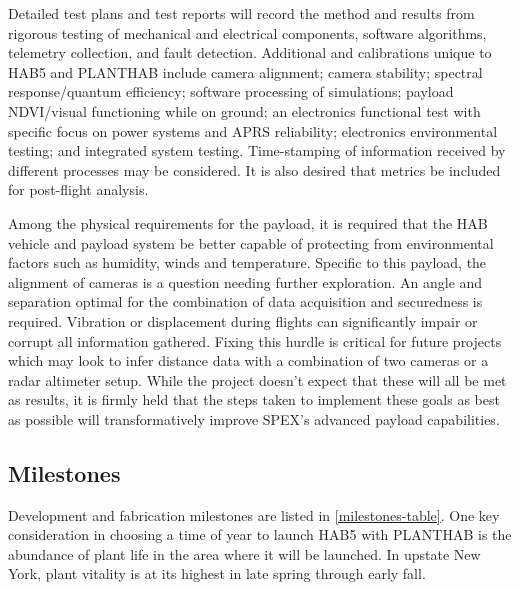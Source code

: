 \documentclass[conference]{IEEEtran} %
\begin{document}
Detailed test plans and test reports will record the method and results from rigorous testing of mechanical and electrical components, software algorithms, telemetry collection, and fault detection.
Additional and calibrations unique to HAB5 and PLANTHAB include camera alignment; camera stability; spectral response/quantum efficiency; software processing of simulations; payload NDVI/visual functioning while on ground; an electronics functional test with specific focus on power systems and APRS reliability; electronics environmental testing; and integrated system testing.
Time-stamping of information received by different processes may be considered. 
It is also desired that metrics be included for post-flight analysis.

Among the physical requirements for the payload, it is required that the HAB vehicle and payload system be better capable of protecting from environmental factors such as humidity, winds and temperature. Specific to this payload, the alignment of cameras is a question needing further exploration. An angle and separation optimal for the combination of data acquisition and securedness is required. Vibration or displacement during flights can significantly impair or corrupt all information gathered. Fixing this hurdle is critical for future projects which may look to infer distance data with a combination of two cameras or a radar altimeter setup. While the project doesn't expect that these will all be met as results, it is firmly held that the steps taken to implement these goals as best as possible will transformatively improve SPEX's advanced payload capabilities.

\subsection{Milestones}
Development and fabrication milestones are listed in \autoref{milestones-table}.
One key consideration in choosing a time of year to launch HAB5 with PLANTHAB is the abundance of plant life in the area where it will be launched.
In upstate New York, plant vitality is at its highest in late spring through early fall.
\end{document}
